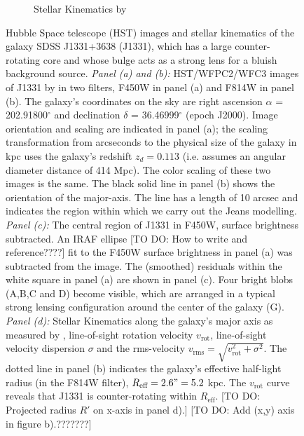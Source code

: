\begin{figure}
\begin{subfigure}{.5\textwidth}
  \caption{Stellar Kinematics by \citet{SWELLSV}}
  \label{fig:kinematics}
\end{subfigure}
\caption{Hubble Space telescope (HST) images and stellar kinematics of the galaxy SDSS J1331+3638 (J1331), which has a large counter-rotating core and whose bulge acts as a strong lens for a bluish background source. \emph{Panel (a) and (b):} HST/WFPC2/WFC3 images of J1331 by \citet{SWELLSI} in two filters, F450W in panel (a) and F814W in panel (b). The galaxy's coordinates on the sky are right ascension $\alpha$ = 202.91800$^\circ$ and declination $\delta$ = 36.46999$^\circ$ (epoch J2000). Image orientation and scaling are indicated in panel (a); the scaling transformation from arcseconds to the physical size of the galaxy in kpc uses the galaxy's redshift $z_d = 0.113$ \citep{SWELLSIII} (i.e. assumes an angular diameter distance of 414 Mpc). The color scaling of these two images is the same. The black solid line in panel (b) shows the orientation of the major-axis. The line has a length of 10 arcsec and indicates the region within which we carry out the Jeans modelling. \emph{Panel (c):} The central region of J1331 in F450W, surface brightness subtracted. An IRAF ellipse [TO DO: How to write and reference????] fit to the F450W surface brightness in panel (a) was subtracted from the image. The (smoothed) residuals within the white square in panel (a) are shown in panel (c). Four bright blobs (A,B,C and D) become visible, which are arranged in a typical strong lensing configuration around the center of the galaxy (G). \emph{Panel (d):} Stellar Kinematics along the galaxy's major axis as measured by \citet{SWELLSV}, line-of-sight rotation velocity $v_\text{rot}$, line-of-sight velocity dispersion $\sigma$ and the rms-velocity $v_\text{rms} = \sqrt{v_\text{rot}^2 + \sigma^2}$. The dotted line in panel (b) indicates the galaxy's effective half-light radius (in the F814W filter), $R_\text{eff} = 2.6" = 5.2$ kpc. The $v_\text{rot}$ curve reveals that J1331 is counter-rotating within $R_\text{eff}$. [TO DO: Projected radius $R'$ on x-axis in panel d).] [TO DO: Add (x,y) axis in figure b).???????]}
\label{fig:specialJ1331}
\end{figure}